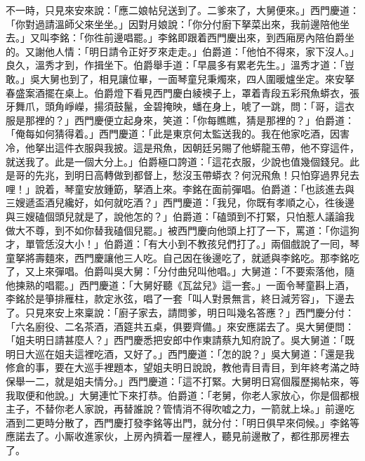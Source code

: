 不一時，只見來安來說：「應二娘帖兒送到了。二爹來了，大舅便來。」西門慶道：「你對過請溫師父來坐坐。」因對月娘說：「你分付廚下拏菜出來，我前邊陪他坐去。」又叫李銘：「你徃前邊唱罷。」李銘即跟着西門慶出來，到西廂房內陪伯爵坐的。又謝他人情：「明日請令正好歹來走走。」伯爵道：「他怕不得來，家下沒人。」良久，溫秀才到，作揖坐下。伯爵舉手道：「早晨多有累老先生。」溫秀才道：「豈敢。」吳大舅也到了，相見讓位畢，一面琴童兒秉燭來，四人圍暖爐坐定。來安拏春盛案酒擺在桌上。伯爵燈下看見西門慶白綾襖子上，罩着青段五彩飛魚蟒衣，張牙舞爪，頭角崢嶸，揚須鼓鬣，金碧掩映，蟠在身上，唬了一跳，問：「哥，這衣服是那裡的？」西門慶便立起身來，笑道：「你每瞧瞧，猜是那裡的？」伯爵道：「俺每如何猜得着。」西門慶道：「此是東京何太監送我的。{}我在他家吃酒，因害冷，他拏出這件衣服與我披。這是飛魚，因朝廷另賜了他蟒龍玉帶，他不穿這件，就送我了。此是一個大分上。」伯爵極口誇道：「這花衣服，少說也值幾個錢兒。此是哥的先兆，到明日高轉做到都督上，愁沒玉帶蟒衣？何況飛魚！只怕穿過界兒去哩！」{}說着，琴童安放鍾筯，拏酒上來。李銘在面前彈唱。伯爵道：「也該進去與三嫂遞盃酒兒纔好，如何就吃酒？」西門慶道：「我兒，你既有孝順之心，徃後邊與三嫂磕個頭兒就是了，說他怎的？」伯爵道：「磕頭到不打緊，只怕惹人議論我做大不尊，到不如你替我磕個兒罷。」被西門慶向他頭上打了一下，罵道：「你這狗才，單管恁沒大小！」伯爵道：「有大小到不教孩兒們打了。」兩個戲說了一囘，琴童拏將壽麵來，西門慶讓他三人吃。自己因在後邊吃了，就遞與李銘吃。那李銘吃了，又上來彈唱。伯爵叫吳大舅：「分付曲兒叫他唱。」大舅道：「不要索落他，隨他揀熟的唱罷。」西門慶道：「大舅好聽《瓦盆兒》這一套。」一面令琴童斟上酒，李銘於是箏排雁柱，款定氷弦，唱了一套「叫人對景無言，終日減芳容」，下邊去了。只見來安上來稟說：「廚子家去，請問爹，明日叫幾名答應？」西門慶分付：「六名廚役、二名茶酒，酒筵共五桌，俱要齊備。」來安應諾去了。吳大舅便問：「姐夫明日請甚麼人？」西門慶悉把安郎中作東請蔡九知府說了。吳大舅道：「既明日大巡在姐夫這裡吃酒，又好了。」西門慶道：「怎的說？」吳大舅道：「還是我修倉的事，要在大巡手裡題本，望姐夫明日說說，教他青目青目，到年終考滿之時保舉一二，就是姐夫情分。」西門慶道：「這不打緊。大舅明日寫個履歷揭帖來，等我取便和他說。」大舅連忙下來打恭。伯爵道：「老舅，你老人家放心，你是個都根主子，不替你老人家說，再替誰說？管情消不得吹嘘之力，一箭就上垛。」{}前邊吃酒到二更時分散了，西門慶打發李銘等出門，就分付：「明日俱早來伺候。」李銘等應諾去了。小厮收進家伙，上房內擠着一屋裡人，聽見前邊散了，都徃那房裡去了。

